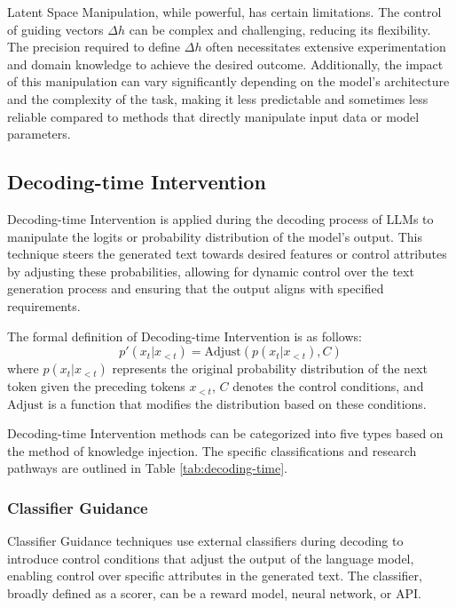 \documentclass[acmsmall, screen]{acmart}
\begin{document}
Latent Space Manipulation, while powerful, has certain limitations. The control of guiding vectors \( \Delta h \) can be complex and challenging, reducing its flexibility. The precision required to define \( \Delta h \) often necessitates extensive experimentation and domain knowledge to achieve the desired outcome. Additionally, the impact of this manipulation can vary significantly depending on the model's architecture and the complexity of the task, making it less predictable and sometimes less reliable compared to methods that directly manipulate input data or model parameters.

\subsection{Decoding-time Intervention}
Decoding-time Intervention is applied during the decoding process of LLMs to manipulate the logits or probability distribution of the model's output. This technique steers the generated text towards desired features or control attributes by adjusting these probabilities, allowing for dynamic control over the text generation process and ensuring that the output aligns with specified requirements.

The formal definition of Decoding-time Intervention is as follows:
\begin{equation}
p'(x_t | x_{<t}) = \text{Adjust}(p(x_t | x_{<t}), C)
\end{equation}
where \( p(x_t | x_{<t}) \) represents the original probability distribution of the next token given the preceding tokens \( x_{<t} \), \( C \) denotes the control conditions, and \( \text{Adjust} \) is a function that modifies the distribution based on these conditions.

Decoding-time Intervention methods can be categorized into five types based on the method of knowledge injection. The specific classifications and research pathways are outlined in Table \ref{tab:decoding-time}.



\subsubsection{\textbf{Classifier Guidance}} 
Classifier Guidance techniques use external classifiers during decoding to introduce control conditions that adjust the output of the language model, enabling control over specific attributes in the generated text. The classifier, broadly defined as a scorer, can be a reward model, neural network, or API.
\end{document}
